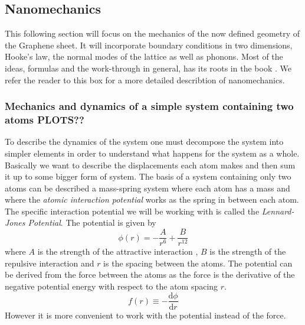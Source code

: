 
\subsection{Nanomechanics}
This following section will focus on the mechanics of the now defined geometry of the Graphene sheet. It will incorporate boundary conditions in two dimensions, Hooke's law, the normal modes of the lattice as well as phonons. Most of the ideas, formulas and the work-through in general, has its roots in the book . We refer the reader to this box for a more detailed describtion of nanomechanics.  
\subsubsection{Mechanics and dynamics of a simple system containing two atoms PLOTS??}
To describe the dynamics of the system one must decompose the system into simpler elements in order to understand what happens for the system as a whole. Basically we want to describe the displacements each atom makes and then sum it up to some bigger form of system. The basis of a system containing only two atoms can be described a mass-spring system where each atom has a mass and where the \textit{atomic interaction potential} works as the spring in between each atom. The specific interaction potential we will be working with is called the \textit{Lennard-Jones Potential}. The potential is given by \begin{equation}
    \phi(r)=-\dfrac{A}{r^{6}}+\dfrac{B}{r^{12}}\label{LJPot}
\end{equation} where $A$ is the strength of the attractive interaction , $B$ is the strength of the repulsive interaction and $r$ is the spacing between the atoms.
The potential can be derived from the force between the atoms as the force is the derivative of the negative potential energy with respect to the atom spacing $r$.\begin{equation}
    f(r)\equiv -\dfrac{\text{d}\phi}{\text{d}r}
\end{equation} However it is more convenient to work with the potential instead of the force. \\
